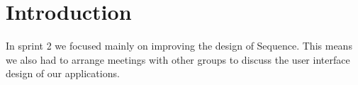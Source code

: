 \section{Introduction}
In sprint 2 we focused mainly on improving the design of Sequence. 
This means we also had to arrange meetings with other groups to discuss the user interface design of our applications.